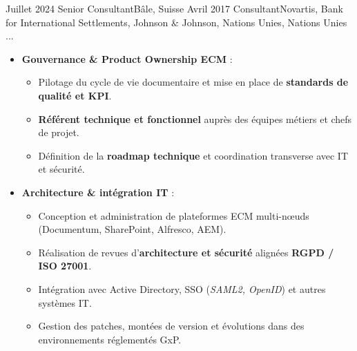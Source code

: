 %
%
%

\begin{experiences}

\consultantexperience
    {Juillet 2024} {Senior Consultant}{}{Bâle, Suisse}
    {Avril 2017}    {Consultant}{Novartis, Bank for International Settlements, Johnson \& Johnson, Nations Unies, Nations Unies ...} {
        \begin{itemize}[left=0pt,label={},itemsep=0.5em]
        \vspace{0.3em}  %
          \item \textbf{Gouvernance \& Product Ownership ECM} :
            \begin{itemize}[itemsep=0.2em,topsep=0.2em,parsep=0pt]
              \small
              \item Pilotage du cycle de vie documentaire et mise en place de \textbf{standards de qualité et KPI}.
              \item \textbf{Référent technique et fonctionnel} auprès des équipes métiers et chefs de projet.
              \item Définition de la \textbf{roadmap technique} et coordination transverse avec IT et sécurité.
            \end{itemize}

          \item \textbf{Architecture \& intégration IT} :
            \begin{itemize}[itemsep=0.2em,topsep=0.2em,parsep=0pt]
              \small
              \item Conception et administration de plateformes ECM multi-nœuds (Documentum, SharePoint, Alfresco, AEM).
              \item Réalisation de revues d’\textbf{architecture et sécurité} alignées \textbf{RGPD / ISO 27001}.
              \item Intégration avec Active Directory, SSO (\textit{SAML2, OpenID}) et autres systèmes IT.
              \item Gestion des patches, montées de version et évolutions dans des environnements réglementés GxP.
            \end{itemize}


\end{itemize}}
\end{experiences}

